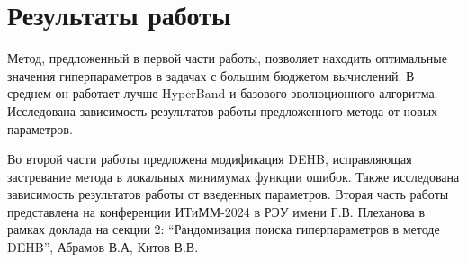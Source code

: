 \documentclass[a4paper,12pt]{article}
\begin{document}
\section{Результаты работы}
Метод, предложенный в первой части работы, позволяет находить оптимальные значения гиперпараметров в задачах с большим бюджетом вычислений. В среднем он работает лучше HyperBand и базового эволюционного алгоритма. Исследована зависимость результатов работы предложенного метода от новых параметров.

Во второй части работы предложена модификация DEHB, исправляющая застревание метода в локальных минимумах функции ошибок. Также исследована зависимость результатов работы от введенных параметров. Вторая часть работы представлена на конференции ИТиММ-2024 в РЭУ имени Г.В. Плеханова в рамках доклада на секции 2: ``Рандомизация поиска гиперпараметров в методе DEHB'', Абрамов В.А, Китов В.В.

\newpage
\end{document}
